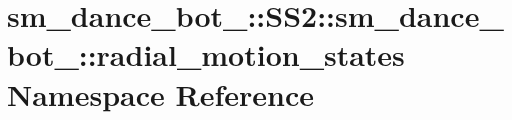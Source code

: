 \hypertarget{namespacesm__dance__bot__3_1_1SS2_1_1sm__dance__bot__3_1_1radial__motion__states}{}\section{sm\+\_\+dance\+\_\+bot\+\_\+:\+:S\+S2\+:\+:sm\+\_\+dance\+\_\+bot\+\_\+:\+:radial\+\_\+motion\+\_\+states Namespace Reference}
\label{namespacesm__dance__bot__3_1_1SS2_1_1sm__dance__bot__3_1_1radial__motion__states}
